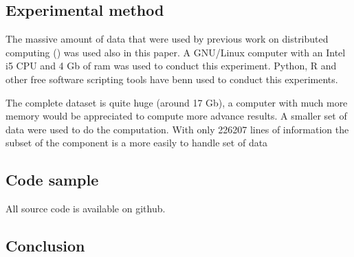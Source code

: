 \documentclass{sig-alternate-10pt}
\begin{document}
\subsection{Experimental method}

The massive amount of data that were used by previous work on distributed computing (\cite{ja_ko_mascots09})
was used also in this paper. A GNU/Linux computer with an Intel i5 CPU and 4 Gb of ram was used to conduct this
experiment. Python, R and other free software scripting tools have benn used to conduct this experiments.

The complete dataset is quite huge (around 17 Gb), a computer with much more memory would be appreciated to
compute more advance results. A smaller set of data were used to do the computation. With only 226207 lines 
of information the subset of the component is a more easily to handle set of data

\subsection{Code sample}

All source code is available on github.






\subsection{Conclusion}
\end{document}

